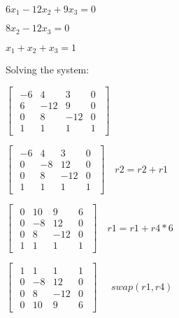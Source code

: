 $6x_1 - 12x_2 + 9x_3 = 0$
\singlespacing

$8x_2 - 12x_3 = 0$
\singlespacing

$x_1 + x_2 + x_3 = 1$

\singlespacing
\singlespacing
Solving the system:
\singlespacing

\begin{math}
    \begin{bmatrix}
        \begin{array}{ccc|c}
            -6 & 4   & 3   & 0 \\
            6  & -12 & 9   & 0 \\
            0  & 8   & -12 & 0 \\
            1  & 1   & 1   & 1
        \end{array}
    \end{bmatrix}
\end{math}

\singlespacing

\begin{math}
    \begin{bmatrix}
        \begin{array}{ccc|c}
            -6 & 4  & 3   & 0 \\
            0  & -8 & 12  & 0 \\
            0  & 8  & -12 & 0 \\
            1  & 1  & 1   & 1
        \end{array}
    \end{bmatrix}\quad
    r2 = r2  + r1
\end{math}

\singlespacing

\begin{math}
    \begin{bmatrix}
        \begin{array}{ccc|c}
            0 & 10 & 9   & 6 \\
            0 & -8 & 12  & 0 \\
            0 & 8  & -12 & 0 \\
            1 & 1  & 1   & 1
        \end{array}
    \end{bmatrix}\quad
    r1 = r1  + r4*6
\end{math}

\singlespacing

\begin{math}
    \begin{bmatrix}
        \begin{array}{ccc|c}
            1 & 1  & 1   & 1 \\
            0 & -8 & 12  & 0 \\
            0 & 8  & -12 & 0 \\
            0 & 10 & 9   & 6
        \end{array}
    \end{bmatrix}\quad
    \begin{array}{c}
        swap(r1, r4)
    \end{array}
\end{math}

